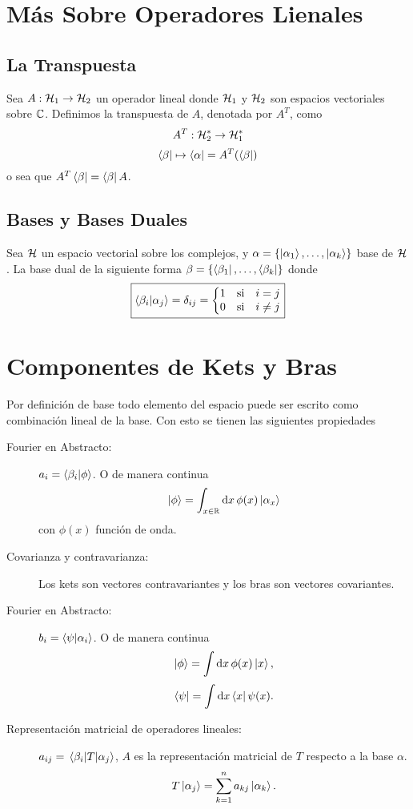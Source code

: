 \section{Más Sobre Operadores Lienales}

\subsection{La Transpuesta}
Sea $A:\mathcal{H} _1 \to \mathcal{H} _2$ un operador lineal  donde $\mathcal{H} _1$ y $\mathcal{H} _2$ son espacios vectoriales sobre $\mathbb{C}$. Definimos la transpuesta de $A$, denotada por $A^T$, como
	$$ A^T : \mathcal{H} _2 ^* \to \mathcal{H} _1 ^* $$
	$$ \bra{\beta} \mapsto \bra{\alpha} = A^T (\bra{\beta}) $$
o sea que $A^T \bra{\beta} = \bra{\beta} A$.



\subsection{Bases y Bases Duales}

Sea $\mathcal{H}$ un espacio vectorial sobre los complejos, y $\alpha = \{ \ket{\alpha_1},\ldots ,\ket{\alpha _k} \}$ base de $\mathcal{H}$. La base dual de la siguiente forma $\beta = \{ \bra{\beta _1} ,\ldots ,\bra{\beta _k} \}$ donde
	$$ \boxed{ \braket{\beta _i}{\alpha _j} = \delta _{ij} = \left\{ \mqty{1 & \text{si} & i=j \\ 0 & \text{si} & i\neq j} \right. } $$




\section{Componentes de Kets y Bras}
Por definición de base todo elemento del espacio puede ser escrito como combinación lineal de la base. Con esto se tienen las siguientes propiedades
\begin{description}
	\item[Fourier en Abstracto: ] $a_i = \braket{\beta _i}{\phi}$. O de manera continua
		$$ \ket{\phi} = \int _{x\in \mathbb{R}} \dd{x} \phi (x) \ket{\alpha _x} $$
		con $\phi (x)$ función de onda.
	\item[Covarianza y contravarianza: ] Los kets son vectores contravariantes y los bras son vectores covariantes.
	\item[Fourier en Abstracto: ] $b_i = \braket{\psi}{\alpha _i}$. O de manera continua
		$$ \ket{\phi} = \int \dd{x} \phi (x) \ket{x}, $$
		$$ \bra{\psi} = \int \dd{x} \bra{x} \psi (x). $$
	\item[Representación matricial de operadores lineales: ] $a_{ij} = \mel{\beta _i}{T}{\alpha _j}$, $A$ es la representación matricial de $T$ respecto a la base $\alpha$.
		$$ T\ket{\alpha _j} = \sum _{k=1} ^n a_{kj} \ket{\alpha _k}. $$
\end{description}


